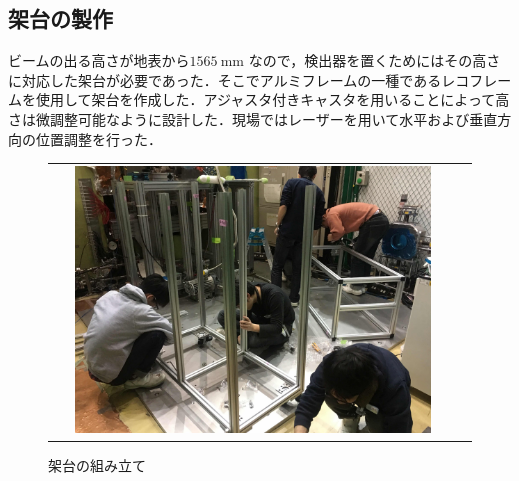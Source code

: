 \subsection{架台の製作}

ビームの出る高さが地表から$1565~\mathrm{mm}$ なので，検出器を置くためにはその高さに対応した架台が必要であった．そこでアルミフレームの一種であるレコフレームを使用して架台を作成した．アジャスタ付きキャスタを用いることによって高さは微調整可能なように設計した．現場ではレーザーを用いて水平および垂直方向の位置調整を行った．

\begin{figure}[H]
\begin{tabular}{cc}
\begin{minipage}{0.5\hsize}
\centering
\includegraphics[width=0.9\textwidth]{figure/hayakawa/kadai_setup.jpg}
\caption{架台の組み立て}
\end{minipage}
\begin{minipage}{0.5\hsize}
\centering

\end{minipage}
\end{tabular}
\end{figure}
